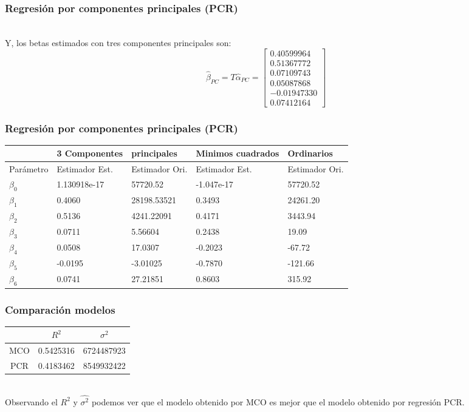 \documentclass[12pt]{beamer}
\begin{document}
\begin{frame}
\frametitle{Regresión por componentes principales (PCR)}
~\\Y, los betas estimados con tres componentes principales son:
$$\hat{\beta}_{PC}=T\hat{\alpha}_{PC}=\left[\begin{matrix}
 0.40599964 \\ 
 0.51367772 \\ 
 0.07109743 \\ 
 0.05087868 \\ 
 -0.01947330 \\ 
 0.07412164
 \end{matrix}\right]$$
\end{frame}

\begin{frame}
\frametitle{Regresión por componentes principales (PCR)}
\begin{tabular}{|p{1.8cm}|p{2.5cm}p{2.5cm}|p{3cm}p{2.5cm}|}
\hline 
  &3 Componentes&principales&Minimos cuadrados&Ordinarios \\ 
\hline 
Parámetro & Estimador Est. & Estimador Ori. & Estimador Est. & Estimador Ori. \\ 
 
$\beta_{0}$ & 1.130918e-17 & 57720.52 & -1.047e-17 & 57720.52 \\ 
 
$\beta_{1}$ & 0.4060 & 28198.53521 & 0.3493 & 24261.20 \\ 
 
$\beta_{2}$ & 0.5136 & 4241.22091 & 0.4171 & 3443.94 \\ 
 
$\beta_{3}$ & 0.0711 & 5.56604 & 0.2438 & 19.09 \\ 
 
$\beta_{4}$ & 0.0508 & 17.0307 & -0.2023 & -67.72 \\ 
 
$\beta_{5}$ & -0.0195 & -3.01025 & -0.7870 & -121.66 \\ 
 
$\beta_{6}$ & 0.0741 & 27.21851 & 0.8603 & 315.92 \\ 
\hline 
\end{tabular} 
\end{frame}

\begin{frame}
\frametitle{Comparación modelos}
\begin{center}
\begin{tabular}{|ccc|}
\hline 
 & $R^2$ & $\sigma^2$ \\ 
\hline 
MCO & 0.5425316 & 6724487923 \\ 
\hline 
PCR & 0.4183462 & 8549932422 \\ 
\hline 
\end{tabular} 
\end{center}
~\\Observando el $R^2$ y $\hat{\sigma^2}$ podemos ver que el modelo obtenido por MCO es mejor que el modelo obtenido por regresión PCR.
\end{frame}
\end{document}
